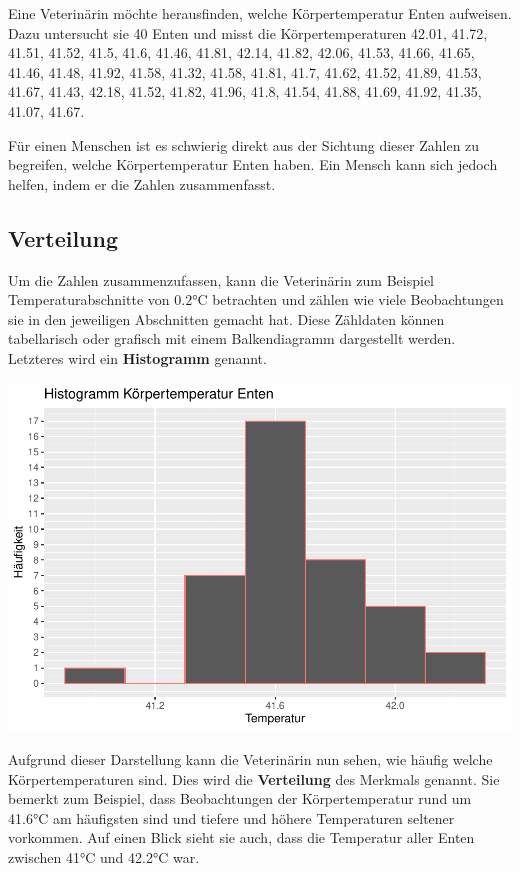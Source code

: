 \documentclass[
]{book}
\theoremstyle{definition}
\theoremstyle{definition}
\theoremstyle{definition}
\theoremstyle{definition}
\theoremstyle{remark}
\begin{document}
Eine Veterinärin möchte herausfinden, welche Körpertemperatur Enten aufweisen. Dazu untersucht sie 40 Enten und misst die Körpertemperaturen 42.01, 41.72, 41.51, 41.52, 41.5, 41.6, 41.46, 41.81, 42.14, 41.82, 42.06, 41.53, 41.66, 41.65, 41.46, 41.48, 41.92, 41.58, 41.32, 41.58, 41.81, 41.7, 41.62, 41.52, 41.89, 41.53, 41.67, 41.43, 42.18, 41.52, 41.82, 41.96, 41.8, 41.54, 41.88, 41.69, 41.92, 41.35, 41.07, 41.67.

Für einen Menschen ist es schwierig direkt aus der Sichtung dieser Zahlen zu begreifen, welche Körpertemperatur Enten haben. Ein Mensch kann sich jedoch helfen, indem er die Zahlen zusammenfasst.

\subsection{Verteilung}\label{verteilung}

Um die Zahlen zusammenzufassen, kann die Veterinärin zum Beispiel Temperaturabschnitte von \(0.2\)°C betrachten und zählen wie viele Beobachtungen sie in den jeweiligen Abschnitten gemacht hat. Diese Zähldaten können tabellarisch oder grafisch mit einem Balkendiagramm dargestellt werden. Letzteres wird ein \textbf{Histogramm} genannt.

\includegraphics{aps_statistik1_files/figure-latex/enten_histogramm-1.pdf}

Aufgrund dieser Darstellung kann die Veterinärin nun sehen, wie häufig welche Körpertemperaturen sind. Dies wird die \textbf{Verteilung} des Merkmals genannt. Sie bemerkt zum Beispiel, dass Beobachtungen der Körpertemperatur rund um 41.6°C am häufigsten sind und tiefere und höhere Temperaturen seltener vorkommen. Auf einen Blick sieht sie auch, dass die Temperatur aller Enten zwischen 41°C und 42.2°C war.
\end{document}
